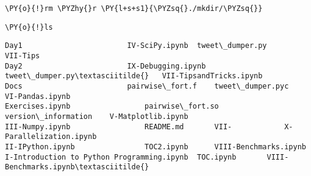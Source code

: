 
{\par%
\vspace{-1\baselineskip}%
}%
\begin{notebookcell}[25]%
\begin{addmargin}[\cellleftmargin]{0em}%
{\smaller%
\par%
%
\vspace{-1\smallerfontscale}%
\begin{Verbatim}[commandchars=\\\{\}]
\PY{o}{!}rm \PYZhy{}r \PY{l+s+s1}{\PYZsq{}./mkdir/\PYZsq{}}
\end{Verbatim}
%
\par%
\vspace{-1\smallerfontscale}}%
\end{addmargin}
\end{notebookcell}



{\par%
\vspace{-1\baselineskip}%
}%
\begin{notebookcell}[31]%
\begin{addmargin}[\cellleftmargin]{0em}%
{\smaller%
\par%
%
\vspace{-1\smallerfontscale}%
\begin{Verbatim}[commandchars=\\\{\}]
\PY{o}{!}ls
\end{Verbatim}
%
\par%
\vspace{-1\smallerfontscale}}%
\end{addmargin}
\end{notebookcell}

\par\vspace{1\smallerfontscale}%
    \begin{addmargin}[\cellleftmargin]{0em}%
    {\smaller%
    \vspace{-1\smallerfontscale}%
    
    \begin{Verbatim}[commandchars=\\\{\}]
Day1					    IV-SciPy.ipynb	tweet\_dumper.py		VII-Tips
Day2					    IX-Debugging.ipynb	tweet\_dumper.py\textasciitilde{}	VII-TipsandTricks.ipynb
Docs					    pairwise\_fort.f	tweet\_dumper.pyc	VI-Pandas.ipynb
Exercises.ipynb				    pairwise\_fort.so	version\_information	V-Matplotlib.ipynb
III-Numpy.ipynb				    README.md		VII-			X-Parallelization.ipynb
II-IPython.ipynb			    TOC2.ipynb		VIII-Benchmarks.ipynb
I-Introduction to Python Programming.ipynb  TOC.ipynb		VIII-Benchmarks.ipynb\textasciitilde{}
    \end{Verbatim}
}%
    \end{addmargin}%

